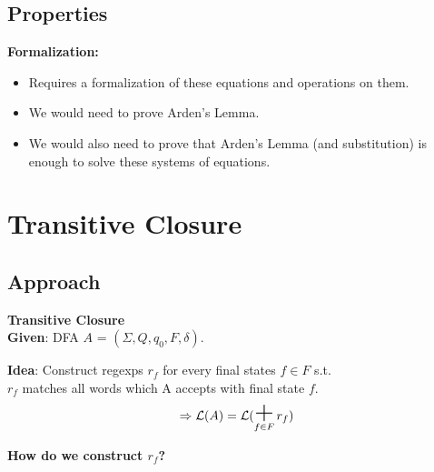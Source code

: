 \documentclass{beamer}
\DeclareMathOperator*{\bigplus}{\mbox{\huge +}}
\begin{document}
\subsection*{Properties}
\begin{frame}
    \textbf{Formalization:} \\
    \begin{itemize}
        \item
            Requires a formalization of these equations and operations on them. 
        \item
            We would need to prove Arden's Lemma.
        \item
            We would also need to prove that Arden's Lemma (and substitution) is enough to solve these systems of equations.
    \end{itemize} 
\end{frame}

\section{Transitive Closure}
\subsection*{Approach}
\begin{frame}

    \large{\textbf{Transitive Closure}} \\

    \textbf{Given}: DFA $A$ = $(\Sigma, Q, q_0, F, \delta)$.

    \textbf{Idea}: Construct regexps $r_f$ for every final states $f \in F$ s.t. \\$r_f$ matches all words which A accepts with final state $f$. \\

    \[
        \, \Rightarrow \mathcal{L}(A) = \mathcal{L}(\bigplus\limits_{f \in F} r_f)
    \]

    \vspace{5 mm}

     \textbf{How do we construct $r_f$?} 

\end{frame}
\end{document}
